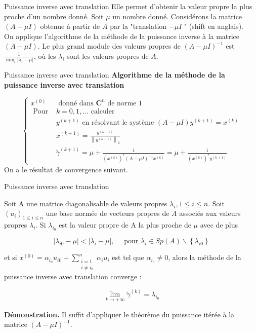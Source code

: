 \documentclass[french, 10pt]{beamer}
\theoremstyle{definition}
\begin{document}
\begin{frame}{Puissance inverse avec translation}
    Elle permet d'obtenir la valeur propre la plus proche d'un nombre donné. Soit $\mu$ un nombre donné. Considérons la matrice $(A-\mu I)$ obtenue à partir de $A$ par la "translation $-\mu I$ " (shift en anglais). \\On applique l'algorithme de la méthode de la puissance inverse à la matrice $(A-\mu I)$. Le plus grand module des valeurs propres de $(A-\mu I)^{-1}$ est $\frac{1}{\min _i\left|\lambda_i-\mu\right|}$, où les $\lambda_i$ sont les valeurs propres de $A$.


\end{frame}
\begin{frame}{Puissance inverse avec translation}
    \textbf{Algorithme de la méthode de la puissance inverse avec translation}

$$
\begin{cases}x^{(0)} & \text { donné dans } \mathbf{C}^n \text { de norme } 1 \\ \text { Pour } & k=0,1, \ldots \text { calculer } \\ & y^{(k+1)} \text { en résolvant le système }(A-\mu I) y^{(k+1)}=x^{(k)} \\ & x^{(k+1)}=\frac{y^{(k+1)}}{\left\|y^{(k+1)}\right\|_2} \\ & \tilde{\gamma}^{(k+1)}=\mu+\frac{1}{\left(x^{(k)}\right)^*(A-\mu I)^{-1} x^{(k)}}=\mu+\frac{1}{\left(x^{(k)}\right)^* y^{(k+1)}}\end{cases}
$$
On a le résultat de convergence suivant.
\end{frame}
\begin{frame}{Puissance inverse avec translation}
    \begin{corollary}
        Soit A une matrice diagonalisable de valeurs propres $\lambda_i, 1 \leq i \leq n$. Soit $\left(u_i\right)_{1 \leq i \leq n}$ une base normée de vecteurs propres de $A$ associés aux valeurs propres $\lambda_i$.
Si $\lambda_{i_0}$ est la valeur propre de A la plus proche de $\mu$ avec de plus

$$
\left|\lambda_{i 0}-\mu\right|<\left|\lambda_i-\mu\right|, \quad \text { pour } \lambda_i \in S p(A) \backslash\left\{\lambda_{i 0}\right\}
$$

et si $x^{(0)}=\alpha_{i_0} u_{i 0}+\sum_{\substack{i=1 \\ i \neq i_0}}^n \alpha_i u_i$ est tel que $\alpha_{i_0} \neq 0$, alors la méthode de la puissance inverse avec translation converge :

$$
\lim _{k \rightarrow+\infty} \widetilde{\gamma}^{(k)}=\lambda_{i_0}
$$
    \end{corollary}
    \textbf{Démonstration.}
Il suffit d'appliquer le théorème du puissance itérée à la matrice $(A-\mu I)^{-1}$.
\end{frame}
\end{document}
